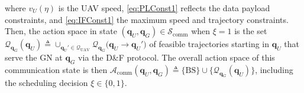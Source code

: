 \documentclass[12pt, draftcls, onecolumn]{IEEEtran}
\theoremstyle{plain}
\theoremstyle{definition}
\theoremstyle{remark}
\begin{document}
 where $v_U(\eta)$ is the UAV speed, \ref{eq:PLConst1} reflects the data payload constraints, and \ref{eq:IFConst1} the maximum speed and trajectory constraints. Then, the action space in state $(\mathbf{q}_{U},\mathbf{q}_{G}){\in}\mathcal{S}_{\mathrm{comm}}$ when $\xi{=}1$ is the set $\mathcal{Q}_{\mathbf{q}_{G}}(\mathbf{q}_{U}){\triangleq}\cup_{\mathbf{q}_{U}'{\in}\mathcal{Q}_{\mathrm{UAV}}}\mathcal{Q}_{\mathbf{q}_{G}}\big(\mathbf{q}_{U}{\rightarrow}\mathbf{q}_{U}'\big)$ of feasible trajectories starting in $\mathbf{q}_{U}$ that serve the GN at $\mathbf{q}_{G}$ via the D\&F protocol. The overall action space of this communication state is then $\mathcal{A}_{\mathrm{comm}}(\mathbf{q}_{U},\mathbf{q}_{G}){\triangleq}\{\mathrm{BS}\}{\cup}\{\mathcal{Q}_{\mathbf{q}_{G}}(\mathbf{q}_{U})\}$, including the scheduling decision $\xi\in\{0,1\}$.
\end{document}
